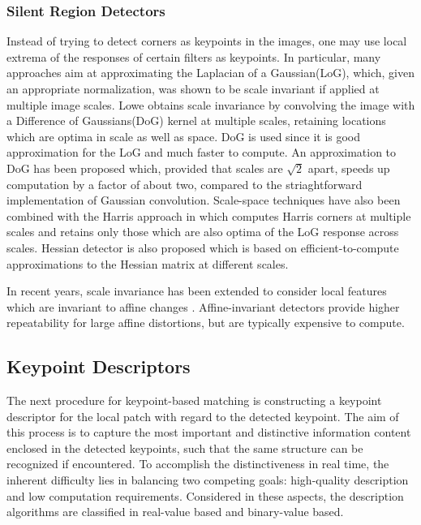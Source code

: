 \subsubsection{Silent Region Detectors}
Instead of trying to detect corners as keypoints in the images, one may use local extrema of the responses of certain filters as keypoints. In particular, many approaches aim at approximating the Laplacian of a Gaussian(LoG), which, given an appropriate normalization, was shown to be scale invariant if applied at multiple image scales\cite{lindeberg_scale-space_1994}. Lowe\cite{lowe_distinctive_2004} obtains scale invariance by convolving the image with a Difference of Gaussians(DoG) kernel at multiple scales, retaining locations which are optima in scale as well as space. DoG is used since it is good approximation for the LoG and much faster to compute. An approximation to DoG has been proposed which, provided that scales are $\sqrt{2}$ apart, speeds up computation by a factor of about two, compared to the striaghtforward implementation of Gaussian convolution\cite{crowley_fast_2003}. Scale-space techniques have also been combined with the Harris approach in \cite{mikolajczyk_indexing_2001} which computes Harris corners at multiple scales and retains only those which are also optima of the LoG response across scales. Hessian detector\cite{bay_speeded-up_2008} is also proposed which is based on efficient-to-compute approximations to the Hessian matrix at different scales.

In recent years, scale invariance has been extended to consider local features which are invariant to affine changes \cite{mikolajczyk_affine_2002,brown_invariant_2002,schaffalitzky_multi-view_2002}. Affine-invariant detectors provide higher repeatability for large affine distortions\cite{lowe_distinctive_2004,mikolajczyk_affine_2002}, but are typically expensive to compute\cite{mikolajczyk_comparison_2005,moreels_evaluation_2007}.


\subsection{Keypoint Descriptors}
The next procedure for keypoint-based matching is constructing a keypoint descriptor for the local patch with regard to the detected keypoint. The aim of this process is to capture the most important and distinctive information content enclosed in the detected keypoints, such that the same structure can be recognized if encountered. To accomplish the distinctiveness in real time, the inherent difficulty lies in balancing two competing goals: high-quality description and low computation requirements. Considered in these aspects, the description algorithms are classified in real-value based\cite{lowe_distinctive_2004,ke_pca-sift:_2004,bay_speeded-up_2008} and binary-value based\cite{calonder_brief:_2010,leutenegger_brisk:_2011,alahi_freak:_2012,rublee_orb:_2011}.

